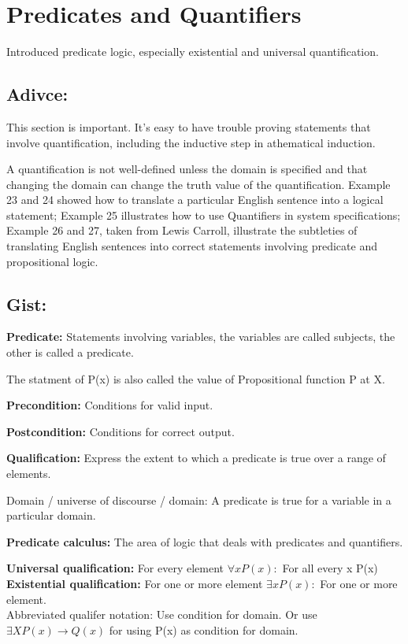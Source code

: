 \documentclass[none,green,normal,cn]{elegantnote}
\begin{document}
\section{Predicates and Quantifiers}
Introduced predicate logic, especially existential and universal quantification.
\subsection{Adivce:}
This section is important. It's easy to have trouble proving statements that involve quantification, including the inductive step in  athematical induction.

A quantification is not well-defined unless the domain is specified and that changing the domain can change the truth value of the quantification.
Example 23 and 24 showed how to translate a particular English sentence into a logical statement; 
Example 25 illustrates how to use Quantifiers in system specifications;
Example 26 and 27, taken from Lewis Carroll, illustrate the subtleties of translating English sentences into correct statements involving predicate and propositional logic.

\subsection{Gist:}
\textbf{Predicate:} Statements involving variables, the variables are called subjects, the other is called a predicate.

The statment of P(x) is also called the value of Propositional function P at X.

\textbf{Precondition:} Conditions for valid input.

\textbf{Postcondition:} Conditions for correct output.

\textbf{Qualification:} Express the extent to which a predicate is true over a range of elements.

{{Domain / universe} of discourse} / domain: A predicate is true for a variable in a particular domain.

\textbf{Predicate calculus:} The area of logic that deals with predicates and quantifiers.

\textbf{Universal qualification:} For every element \(\forall x P(x): \) For all every x P(x) \\
\textbf{Existential qualification:} For one or more element \(\exists x P(x): \) For one or more element.\\
Abbreviated qualifer notation: Use condition for domain. Or use \(\exists X P(x) \rightarrow Q(x)\) for using P(x) as condition for domain.
\end{document}
